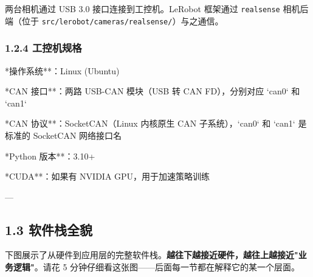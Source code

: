 \documentclass[UTF8,a4paper,11pt]{ctexart}
\begin{document}
两台相机通过 USB 3.0 接口连接到工控机。LeRobot 框架通过 \texttt{realsense} 相机后端（位于 \texttt{src/lerobot/cameras/realsense/}）与之通信。

\subsubsection{1.2.4 工控机规格}

\item **操作系统**：Linux (Ubuntu)
\item **CAN 接口**：两路 USB-CAN 模块（USB 转 CAN FD），分别对应 `can0` 和 `can1`
\item **CAN 协议**：SocketCAN（Linux 内核原生 CAN 子系统），`can0` 和 `can1` 是标准的 SocketCAN 网络接口名
\item **Python 版本**：3.10+
\item **CUDA**：如果有 NVIDIA GPU，用于加速策略训练

---

\subsection{1.3 软件栈全貌}

下图展示了从硬件到应用层的完整软件栈。\textbf{越往下越接近硬件，越往上越接近"业务逻辑"}。请花 5 分钟仔细看这张图——后面每一节都在解释它的某一个层面。
\end{document}
